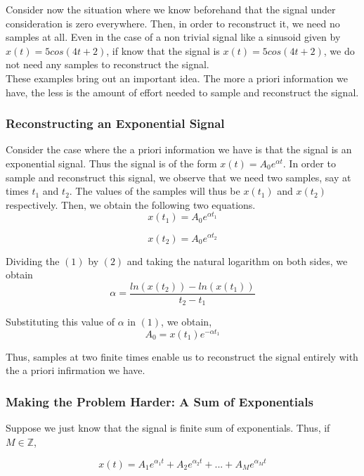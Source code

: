 Consider now the situation where we know beforehand that the signal under consideration is zero everywhere. Then, in order to reconstruct it, we need no samples at all. Even in the case of a non trivial signal like a sinusoid given by $x(t) =  5cos(4t+2)$, if know that the signal is $x(t) = 5cos(4t+2)$, we do not need any samples to reconstruct the signal.\\

These examples bring out an important idea. The more a priori information we have, the less is the amount of effort needed to sample and reconstruct the signal. 

\subsubsection{Reconstructing an Exponential Signal}
Consider the case where the a priori information we have is that the signal is an exponential signal. Thus the signal is of the form $x(t) = A_{0}e^{\alpha t}$. In order to sample and reconstruct this signal, we observe that we need two samples, say at times $t_{1}$ and $t_{2}$. The values of the samples will thus be $x(t_{1})$ and $x(t_{2})$ respectively. Then, we obtain the following two equations.
\begin{equation}
    x(t_{1}) = A_{0}e^{\alpha t_{1}}
\end{equation}

\begin{equation}
    x(t_{2}) = A_{0}e^{\alpha t_{2}}
\end{equation}

Dividing the $(1)$ by $(2)$ and taking the natural logarithm on both sides, we obtain
\[
    \alpha = \frac{ln(x(t_{2})) - ln(x(t_{1}))}{t_{2}-t_{1}}
\]

Substituting this value of $\alpha$ in $(1)$, we obtain,
\[
    A_{0} = x(t_{1})e^{-\alpha t_{1}}
\]

Thus, samples at two finite times enable us to reconstruct the signal entirely with the a priori infirmation we have.

\subsubsection{Making the Problem Harder: A Sum of Exponentials}
Suppose we just know that the signal is finite sum of exponentials. Thus, if $M \in \mathbb{Z}$, 

\[
    x(t) = A_{1}e^{\alpha_{1} t} + A_{2}e^{\alpha_{2} t} + ... + A_{M}e^{\alpha_{M} t}
\]

